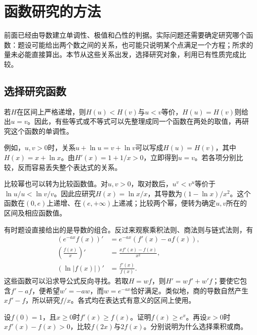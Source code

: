 \FloatBarrier
\newpage
\section{函数研究的方法}
\label{sec:calculus-function-comparison}

\begingroup
\setlength{\parskip}{3.5pt}

前面已经由导数建立单调性、极值和凸性的判据。实际问题还需要确定研究哪个函数：题设可能给出两个数之间的关系，也可能只说明某个点满足一个方程；所求的量未必能直接算出。本节从这些关系出发，选择研究对象，利用已有性质完成比较。

\subsection{选择研究函数}

若\(H\)在区间上严格递增，则\(H(u)<H(v)\)与\(u<v\)等价，\(H(u)=H(v)\)则给出\(u=v\)。因此，有些等式或不等式可以先整理成同一个函数在两处的取值，再研究这个函数的单调性。

例如，\(u,v>0\)时，关系\(u+\ln u=v+\ln v\)可以写成\(H(u)=H(v)\)，其中\(H(x)=x+\ln x\)。由\(H'(x)=1+1/x>0\)，立即得到\(u=v\)。若各项分别比较，反而容易丢失整个表达式的关系。

比较幂也可以转为比较函数值。对\(u,v>0\)，取对数后，\(u^v<v^u\)等价于\(\ln u/u<\ln v/v\)。因此应研究\(H(x)=\ln x/x\)，其导数为\((1-\ln x)/x^2\)。这个函数在\((0,e)\)上递增、在\((e,+\infty)\)上递减；比较两个幂，便转为确定\(u,v\)所在的区间及相应函数值。

有时题设直接给出的是导数的组合。反过来观察乘积法则、商法则与链式法则，有
\begin{equation*}
 \begin{aligned}
 (e^{-ax}f(x))'&=e^{-ax}(f'(x)-af(x)),\\
 \left(\frac{f(x)}x\right)'&=\frac{xf'(x)-f(x)}{x^2},\\
 (\ln|f(x)|)'&=\frac{f'(x)}{f(x)}.
 \end{aligned}
\end{equation*}
这些函数可以沿求导公式反向寻找。若取\(H=wf\)，则\(H'=wf'+w'f\)；要使它包含\(f'-af\)，便希望\(w'=-aw\)，而\(w=e^{-ax}\)恰好满足。类似地，商的导数自然产生\(xf'-f\)，所以研究\(f/x\)。各式均在表达式有意义的区间上使用。

\begin{example}
设\(f(0)=1\)，且\(x\ge0\)时\(f'(x)\ge f(x)\)。证明\(f(x)\ge e^x\)。再设\(x>0\)时\(xf'(x)-f(x)>0\)，比较\(f(2x)\)与\(2f(x)\)。分别说明为什么选择乘积或商。
\end{example}


